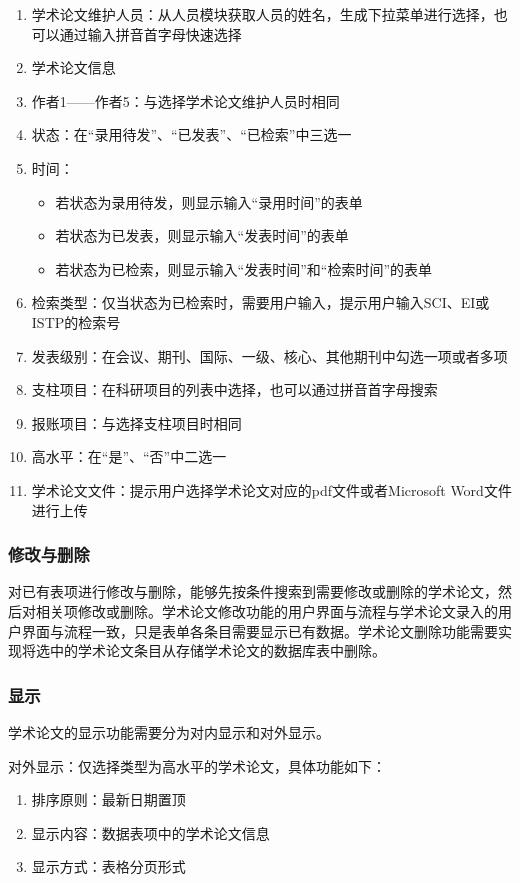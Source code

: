 \begin{enumerate}
\item 学术论文维护人员：从人员模块获取人员的姓名，生成下拉菜单进行选择，也可以通过输入拼音首字母快速选择
\item 学术论文信息
\item 作者1——作者5：与选择学术论文维护人员时相同
\item 状态：在“录用待发”、“已发表”、“已检索”中三选一
\item 时间：
\begin{itemize}
	\item 若状态为录用待发，则显示输入“录用时间”的表单
	\item 若状态为已发表，则显示输入“发表时间”的表单
	\item 若状态为已检索，则显示输入“发表时间”和“检索时间”的表单
\end{itemize}
\item 检索类型：仅当状态为已检索时，需要用户输入，提示用户输入SCI、EI或ISTP的检索号
\item 发表级别：在会议、期刊、国际、一级、核心、其他期刊中勾选一项或者多项
\item 支柱项目：在科研项目的列表中选择，也可以通过拼音首字母搜索
\item 报账项目：与选择支柱项目时相同
\item 高水平：在“是”、“否”中二选一
\item 学术论文文件：提示用户选择学术论文对应的pdf文件或者Microsoft Word文件进行上传
\end{enumerate}

\subsubsection{修改与删除}

对已有表项进行修改与删除，能够先按条件搜索到需要修改或删除的学术论文，然后对相关项修改或删除。学术论文修改功能的用户界面与流程与学术论文录入的用户界面与流程一致，只是表单各条目需要显示已有数据。学术论文删除功能需要实现将选中的学术论文条目从存储学术论文的数据库表中删除。


\subsubsection{显示}

学术论文的显示功能需要分为对内显示和对外显示。

对外显示：仅选择类型为高水平的学术论文，具体功能如下：

\begin{enumerate}
\item 排序原则：最新日期置顶
\item 显示内容：数据表项中的学术论文信息
\item 显示方式：表格分页形式
\end{enumerate}

